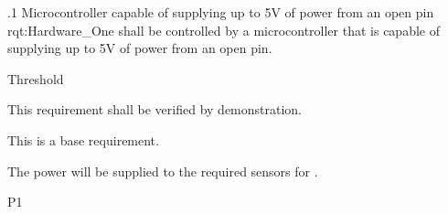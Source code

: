 \ONERQMTV
{\RqtNumberBase.1}
{Microcontroller capable of supplying up to 5V of power from an open pin}
{rqt:Hardware_One}
{\ThisSys shall be controlled by a microcontroller that is capable of supplying up to 5V of power from an open pin.}
{
	\item [All Phases] Threshold
}
{This requirement shall be verified by demonstration.}
{
\item [N/A] This is a base requirement.
}
{
	\item The power will be supplied to the required sensors for \ThisSys.
}
{P1}


